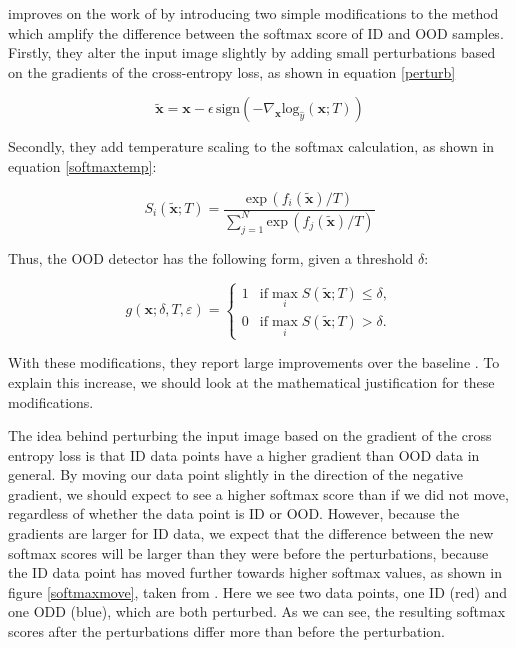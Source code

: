 \documentclass[UKenglish]{uiomasterthesis} %
\theoremstyle{definition}
\begin{document}
\cite{odin} improves on the work of \cite{oodbaseline} by introducing two simple modifications to the method which amplify the difference between the softmax score of ID and OOD samples. Firstly, they alter the input image slightly by adding small perturbations based on the gradients of the cross-entropy loss, as shown in equation \ref{perturb}

\begin{equation}
\tilde{\bm{x}} = \bm{x} - \epsilon \, \text{sign}(-\nabla_{\bm{x}} \text{log}_{\hat{y}}(\bm{x};T))
\label{perturb}
\end{equation}

Secondly, they add temperature scaling to the softmax calculation, as shown in equation \ref{softmaxtemp}:

\begin{equation}
S_i(\tilde{\bm{x}} ; T) = \frac{\text{exp} \, (f_i(\tilde{\bm{x}})/T)}{\sum^N_{j=1} \text{exp} \, (f_j(\tilde{\bm{x}})/T)}
\label{softmaxtemp}
\end{equation}

Thus, the OOD detector has the following form, given a threshold $\delta$:

\begin{equation}
g(\bm{x};\delta,T,\varepsilon)=\left\{\begin{matrix}1&\text{if} \max_{i}S(\tilde{\bm{x}};T)\le\delta,\\ 0&\text{if} \max_{i}S(\tilde{\bm{x}};T)>\delta. \end{matrix}\right.
\label{fullodin}
\end{equation}

With these modifications, they report large improvements over the baseline \cite[4]{odin}. To explain this increase, we should look at the mathematical justification for these modifications.

The idea behind perturbing the input image based on the gradient of the cross entropy loss is that ID data points have a higher gradient than OOD data in general. By moving our data point slightly in the direction of the negative gradient, we should expect to see a higher softmax score than if we did not move, regardless of whether the data point is ID or OOD. However, because the gradients are larger for ID data, we expect that the difference between the new softmax scores will be larger than they were before the perturbations, because the ID data point has moved further towards higher softmax values, as shown in figure \ref{softmaxmove}, taken from \cite[8]{odin}. Here we see two data points, one ID (red) and one ODD (blue), which are both perturbed. As we can see, the resulting softmax scores after the perturbations differ more than before the perturbation.
\end{document}
